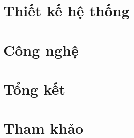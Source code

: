 \documentclass[a4paper]{report}
\theoremstyle{definition}
\begin{document}
\chapter{Thiết kế hệ thống}


\newpage


\newpage


\newpage


\newpage


\newpage



\chapter{Công nghệ}



\chapter{Tổng kết}



\chapter{Tham khảo}


\end{document}
